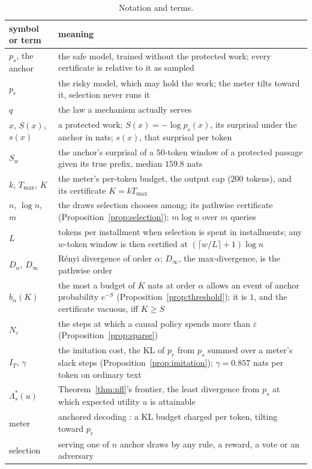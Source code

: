 \documentclass{article}
\begin{document}
\begin{table}[!ht]
\centering\footnotesize
\caption{Notation and terms.}\label{tab:notation}
\begin{tabular}{@{}p{}p{}@{}}
\toprule
symbol or term & meaning \\
\midrule
$p_s$, the anchor & \raggedright the safe model, trained without the protected work; every certificate is relative to it as sampled \tabularnewline
$p_r$ & \raggedright the risky model, which may hold the work; the meter tilts toward it, selection never runs it \tabularnewline
$q$ & \raggedright the law a mechanism actually serves \tabularnewline
$x$, $S(x)$, $s(x)$ & \raggedright a protected work; $S(x) = -\log p_s(x)$, its surprisal under the anchor in nats; $s(x)$, that surprisal per token \tabularnewline
$S_w$ & \raggedright the anchor's surprisal of a $50$-token window of a protected passage given its true prefix, median $159.8$ nats \tabularnewline
$k$, $T_{\max}$, $K$ & \raggedright the meter's per-token budget, the output cap ($200$ tokens), and its certificate $K = kT_{\max}$ \tabularnewline
$n$, $\log n$, $m$ & \raggedright the draws selection chooses among; its pathwise certificate (Proposition~\ref{prop:selection}); $m\log n$ over $m$ queries \tabularnewline
$L$ & \raggedright tokens per installment when selection is spent in installments; any $w$-token window is then certified at $(\lceil w/L\rceil+1)\log n$ \tabularnewline
$D_\alpha$, $D_\infty$ & \raggedright R\'enyi divergence of order $\alpha$; $D_\infty$, the max-divergence, is the pathwise order \tabularnewline
$b_\alpha(K)$ & \raggedright the most a budget of $K$ nats at order $\alpha$ allows an event of anchor probability $e^{-S}$ (Proposition~\ref{prop:threshold}); it is $1$, and the certificate vacuous, iff $K \ge S$ \tabularnewline
$N_\varepsilon$ & \raggedright the steps at which a causal policy spends more than $\varepsilon$ (Proposition~\ref{prop:sparse}) \tabularnewline
$I_T$, $\gamma$ & \raggedright the imitation cost, the KL of $p_r$ from $p_s$ summed over a meter's slack steps (Proposition~\ref{prop:imitation}); $\gamma = 0.857$ nats per token on ordinary text \tabularnewline
$\Lambda^*_s(u)$ & \raggedright Theorem~\ref{thm:nfl}'s frontier, the least divergence from $p_s$ at which expected utility $u$ is attainable \tabularnewline
\midrule
meter & \raggedright anchored decoding \citep{he2026anchored}: a KL budget charged per token, tilting toward $p_r$ \tabularnewline
selection & \raggedright serving one of $n$ anchor draws by any rule, a reward, a vote or an adversary \tabularnewline

\end{tabular}
\end{table}
\end{document}
